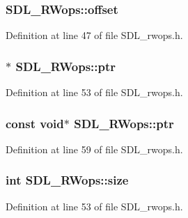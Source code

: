 \subsubsection[{offset}]{ S\+D\+L\+\_\+\+R\+Wops\+::offset}\label{struct_s_d_l___r_wops_a71fb283863acfd186d664f4f2a7eb7d0}


Definition at line 47 of file S\+D\+L\+\_\+rwops.\+h.

\hypertarget{struct_s_d_l___r_wops_a3f68b93789331775de802d51a2934f0a}{}
\subsubsection[{ptr}]{$\ast$ S\+D\+L\+\_\+\+R\+Wops\+::ptr}\label{struct_s_d_l___r_wops_a3f68b93789331775de802d51a2934f0a}


Definition at line 53 of file S\+D\+L\+\_\+rwops.\+h.

\hypertarget{struct_s_d_l___r_wops_a51baff579726790887a4ca41ce14873c}{}
\subsubsection[{ptr}]{\setlength{\rightskip}{0pt plus 5cm}const {\bf void}$\ast$ S\+D\+L\+\_\+\+R\+Wops\+::ptr}\label{struct_s_d_l___r_wops_a51baff579726790887a4ca41ce14873c}


Definition at line 59 of file S\+D\+L\+\_\+rwops.\+h.

\hypertarget{struct_s_d_l___r_wops_ae0bd64203ee30429f8b879cbd543d694}{}
\subsubsection[{size}]{ {\bf int} S\+D\+L\+\_\+\+R\+Wops\+::size}\label{struct_s_d_l___r_wops_ae0bd64203ee30429f8b879cbd543d694}


Definition at line 53 of file S\+D\+L\+\_\+rwops.\+h.

\hypertarget{struct_s_d_l___r_wops_a6c82c345afd893513c15b268f5bb4595}{}
